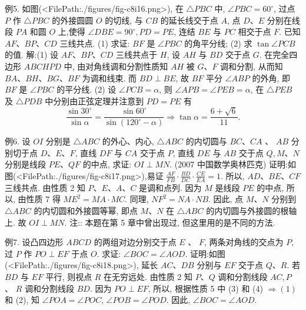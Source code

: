 例5. 如图(<FilePath:./figures/fig-c8i16.png>), 在 $\triangle P B C$ 中, $\angle P B C= 60^{\circ}$, 过点 $P$ 作 $\triangle P B C$ 的外接圆圆 $O$ 的切线, 与 $C B$ 的延长线交于点 $A$, 点 $D 、 E$ 分别在线段 $P A$ 和圆 $O$ 上,使得 $\angle D B E=90^{\circ}, P D=P E$, 连结 $B E$ 与 $P C$ 相交于点 $F$. 已知 $A F 、 B P 、 C D$ 三线共点.
(1) 求证: $B F$ 是 $\angle P B C$ 的角平分线;
(2) 求 $\tan \angle P C B$ 的值.
解:(1) 设 $A F 、 B P 、 C D$ 三线共点于 $H$, 设 $A H$ 与 $B D$ 交于点 $G$. 在完全四边形 $A B C H P D$ 中, 由对角线调和分割性质知 $A H$ 被 $G 、 F$ 调和分割, 从而知 $B A 、 B H 、 B G 、 B F$ 为调和线束.
而 $B D \perp B E$, 故 $B F$ 平分 $\angle A B P$ 的外角, 即 $B F$ 是 $\angle P B C$ 的平分线.
(2) 设 $\angle P C B=\alpha$, 则 $\angle A P B=\angle P E B=\alpha$, 在 $\triangle P E B$ 及 $\triangle P D B$ 中分别由正弦定理并注意到 $P D=P E$ 有
$$
\frac{\sin 30^{\circ}}{\sin \alpha}=\frac{\sin 60^{\circ}}{\sin \left(120^{\circ}-\alpha\right)} \Rightarrow \tan \alpha=\frac{6+\sqrt{6}}{11} .
$$



例6. 设 $O I$ 分别是 $\triangle A B C$ 的外心、内心, $\triangle A B C$ 的内切圆与 $B C 、 C A$ 、 $A B$ 分别切于点 $D 、 E 、 F$, 直线 $D F$ 与 $C A$ 交于点 $P$, 直线 $D E$ 与 $A B$ 交于点 $Q, M 、 N$ 分别是线段 $P E 、 Q F$ 的中点, 求证: $O I \perp M N$. (2007 中国数学奥林匹克)
证明:如图(<FilePath:./figures/fig-c8i17.png>),易证 $\frac{A F}{F B} \cdot \frac{B D}{D C} \cdot \frac{C E}{E A}=1$.
所以, $A D 、 B E 、 C F$ 三线共点.
由性质 2 知 $P 、 E 、 A 、 C$ 是调和点列.
因为 $M$ 是线段 $P E$ 的中点, 所以, 由性质 7 得 $M E^2= M A \cdot M C$. 同理, $N F^2=N A \cdot N B$.
因此, 点 $M 、 N$ 分别到 $\triangle A B C$ 的内切圆和外接圆等幂, 即点 $M 、 N$ 在 $\triangle A B C$ 的内切圆与外接圆的根轴上.
故 $O I \perp M N$.
注:: 本题在第 5 章中曾出现过, 但这里用的是不同的方法.



例7. 设凸四边形 $A B C D$ 的两组对边分别交于点 $E$ 、 $F$, 两条对角线的交点为 $P$, 过 $P$ 作 $P O \perp E F$ 于点 $O$. 求证: $\angle B O C= \angle A O D$.
证明:如图(<FilePath:./figures/fig-c8i18.png>), 延长 $A C 、 D B$ 分别与 $E F$ 交于点 $Q 、 R$. 若 $B D$ 与 $E F$ 平行, 则视点 $R$ 在无穷远处.
由性质 2 知 $P 、 Q$ 调和分割线段 $A C, P$ 、 $R$ 调和分割线段 $B D$.
因为 $P O \perp E F$, 所以, 根据性质 5 中 (3) 和 (4) $\Rightarrow(1)$ 和 (2), 知 $\angle P O A=\angle P O C$,
$\angle P O B=\angle P O D$. 因此, $\angle B O C=\angle A O D$.



